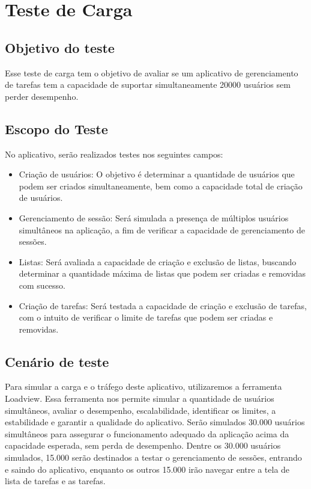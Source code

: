 \chapter{Teste de Carga}


\section*{Objetivo do teste}
Esse teste de carga tem o objetivo de avaliar se um aplicativo de gerenciamento de tarefas tem a capacidade de suportar simultaneamente 20000 usuários sem perder desempenho.

\section*{Escopo do Teste}

No aplicativo, serão realizados testes nos seguintes campos:

\begin{itemize}
    \item Criação de usuários: O objetivo é determinar a quantidade de usuários que podem ser criados simultaneamente, bem como a capacidade total de criação de usuários.
    \item Gerenciamento de sessão: Será simulada a presença de múltiplos usuários simultâneos na aplicação, a fim de verificar a capacidade de gerenciamento de sessões.
    \item Listas: Será avaliada a capacidade de criação e exclusão de listas, buscando determinar a quantidade máxima de listas que podem ser criadas e removidas com sucesso.
    \item Criação de tarefas: Será testada a capacidade de criação e exclusão de tarefas, com o intuito de verificar o limite de tarefas que podem ser criadas e removidas.
\end{itemize}

\section*{Cenário de teste}
Para simular a carga e o tráfego deste aplicativo, utilizaremos a ferramenta Loadview. Essa ferramenta nos permite simular a quantidade de usuários simultâneos, avaliar o desempenho, escalabilidade, identificar os limites, a estabilidade e garantir a qualidade do aplicativo. Serão simulados 30.000 usuários simultâneos para assegurar o funcionamento adequado da aplicação acima da capacidade esperada, sem perda de desempenho. Dentre os 30.000 usuários simulados, 15.000 serão destinados a testar o gerenciamento de sessões, entrando e saindo do aplicativo, enquanto os outros 15.000 irão navegar entre a tela de lista de tarefas e as tarefas.

